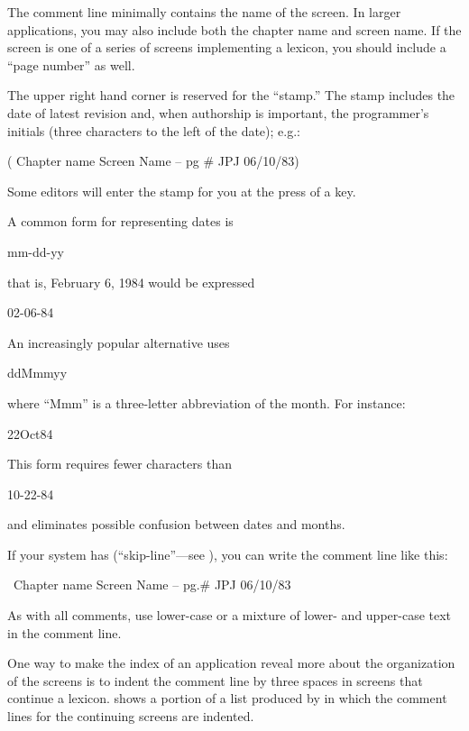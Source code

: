 The comment line minimally contains the name of the screen.  In larger
applications, you may also include both the chapter name and screen
name.  If the screen is one of a series of screens implementing a
lexicon, you should include a ``page number'' as well.

%
The upper right hand corner is reserved for the ``stamp.'' The stamp
includes the date of latest revision and, when authorship is
important, the programmer's initials (three characters to the left of
the date); e.g.:
\begin{Code}
( Chapter name        Screen Name -- pg #      JPJ 06/10/83)
\end{Code}
Some \Forth{} editors will enter the stamp for you at the press of a key.

A common form for representing dates is
\begin{Code}
mm-dd-yy
\end{Code}
that is, February 6, 1984 would be expressed
\begin{Code}
02-06-84
\end{Code}
An increasingly popular alternative uses
\begin{Code}
ddMmmyy
\end{Code}
where ``Mmm'' is a three-letter abbreviation of the month.  For instance:
\begin{Code}
22Oct84
\end{Code}
This form requires fewer characters than
\begin{Code}
10-22-84
\end{Code}
and eliminates possible confusion between dates and months.%
%

If your system has \forth{\bs} (``skip-line''---see ), you can
write the comment line like this:
\begin{Code}
\ Chapter name        Screen Name -- pg.#       JPJ 06/10/83
\end{Code}
As with all comments, use lower-case or a mixture of lower- and
upper-case text in the comment line.

One way to make the index of an application reveal more about the
organization of the screens is to indent the comment line by three
spaces in screens that continue a lexicon.   shows a
portion of a list produced by  in which the comment lines
for the continuing screens are indented.%

